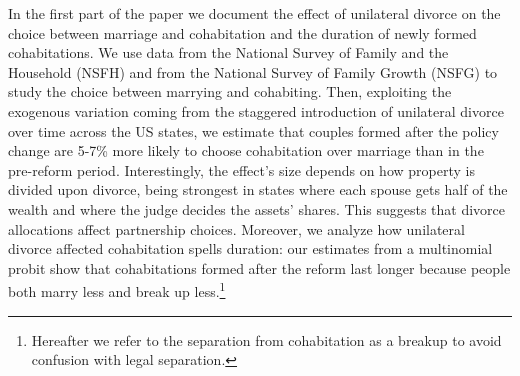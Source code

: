 \documentclass[12pt]{article}
\numberwithin{table}{section}
\begin{document}

In the first part of the paper we document the effect of unilateral divorce on the choice between marriage and cohabitation and the duration of newly formed cohabitations. We use data from the National Survey of Family and the Household (NSFH) and from the National Survey of Family Growth (NSFG) to study the choice between marrying and cohabiting. Then, exploiting the exogenous variation coming from the staggered introduction of unilateral divorce over time across the US states, we estimate that couples formed after the policy change are 5-7\% more likely to choose cohabitation over marriage than in the pre-reform period. %
Interestingly, the effect's size depends on how property is divided upon divorce, being strongest in states where each spouse gets half of the wealth and where the judge decides the assets' shares. This suggests that divorce allocations affect partnership choices.
Moreover, we analyze how unilateral divorce affected cohabitation spells duration: our estimates from a multinomial probit show that cohabitations formed after the reform last longer because people both marry less and break up less.\footnote{Hereafter we refer to the separation from cohabitation as a breakup to avoid confusion with legal separation.}
\end{document}
